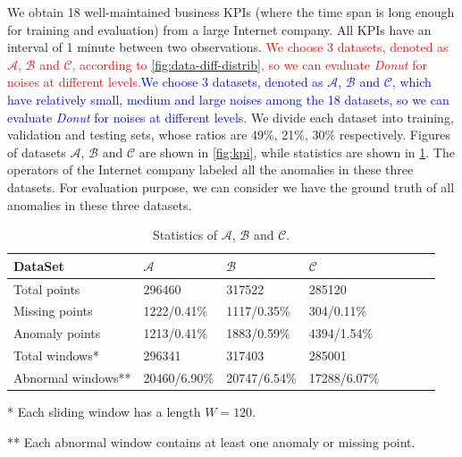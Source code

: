 \documentclass[sigconf]{acmart}
\newif\ifnotcompact\notcompactfalse
\newcommand\compactsub[2]{{\textcolor{red}{#1}}{\textcolor{blue}{#2}}}
\newcommand\compactsub[2]{#2}
\newcommand\compactsub[2]{#1}
\newcommand{\DONUT}{\textit{Donut}}
\newcommand{\DATASETA}{$\mathcal{A}$}
\newcommand{\DATASETB}{$\mathcal{B}$}
\newcommand{\DATASETC}{$\mathcal{C}$}
\begin{document}
We obtain 18 well-maintained business KPIs (where the time span is long enough for training and evaluation) from a large Internet company. All KPIs have an interval of 1 minute between two observations.
\compactsub{We choose 3 datasets, denoted as \DATASETA{}, \DATASETB{} and \DATASETC{}, according to \cref{fig:data-diff-distrib}, so we can evaluate \DONUT{} for noises at different levels.}{We choose 3 datasets, denoted as \DATASETA{}, \DATASETB{} and \DATASETC{}, which have relatively small, medium and large noises among the 18 datasets, so we can evaluate \DONUT{} for noises at different levels.}
We divide each dataset into training, validation and testing sets, whose ratios are 49\%, 21\%, 30\% respectively.
Figures of datasets \DATASETA{}, \DATASETB{} and \DATASETC{} are shown in \cref{fig:kpi}, while statistics are shown in \cref{tab:details-of-datasets}. The operators of the Internet company labeled all the anomalies in these three datasets. For evaluation purpose, we can consider we have the ground truth of all anomalies in these three datasets.

\begin{table}[htbp]
	\footnotesize
	\centering
	\begin{threeparttable}
		\begin{tabularx}{\columnwidth}{
				p{}X
				p{}X
				p{}X
				p{}X
			}
			\toprule
			DataSet & \DATASETA & \DATASETB & \DATASETC   \\
			\midrule
			Total points & 296460 & 317522 & 285120      \\
			Missing points & 1222/0.41\% & 1117/0.35\% & 304/0.11\%           \\
			Anomaly points & 1213/0.41\% & 1883/0.59\% & 4394/1.54\%             \\
			Total windows* & 296341 & 317403 & 285001 \\
			Abnormal windows** & 20460/6.90\% & 20747/6.54\%  & 17288/6.07\%   \\
			\bottomrule
		\end{tabularx}
		\begin{tablenotes}
			\item[*] Each sliding window has a length $W = 120$.
			\item[**] Each abnormal window contains at least one anomaly or missing point.
		\end{tablenotes}
	\end{threeparttable}
	\ifnotcompact
	  \vspace{.5em}
	\fi
	\caption{Statistics of \DATASETA{}, \DATASETB{} and \DATASETC{}.}
	\label{tab:details-of-datasets}
\end{table}
\end{document}

